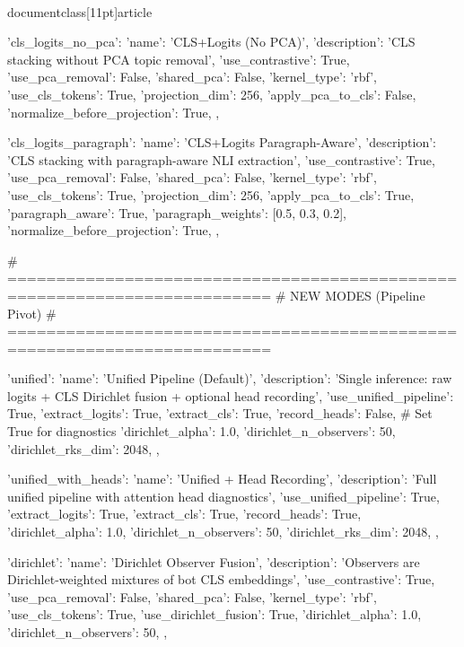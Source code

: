 \\documentclass[11pt]{article}
\begin{document}
\begin{CodeBlock}
{    'cls_logits_no_pca': {
        'name': 'CLS+Logits (No PCA)',
        'description': 'CLS stacking without PCA topic removal',
        'use_contrastive': True,
        'use_pca_removal': False,
        'shared_pca': False,
        'kernel_type': 'rbf',
        'use_cls_tokens': True,
        'projection_dim': 256,
        'apply_pca_to_cls': False,
        'normalize_before_projection': True,
    },
    
    'cls_logits_paragraph': {
        'name': 'CLS+Logits Paragraph-Aware',
        'description': 'CLS stacking with paragraph-aware NLI extraction',
        'use_contrastive': True,
        'use_pca_removal': False,
        'shared_pca': False,
        'kernel_type': 'rbf',
        'use_cls_tokens': True,
        'projection_dim': 256,
        'apply_pca_to_cls': True,
        'paragraph_aware': True,
        'paragraph_weights': [0.5, 0.3, 0.2],
        'normalize_before_projection': True,
    },
    
    # =========================================================================
    # NEW MODES (Pipeline Pivot)
    # =========================================================================
    
    'unified': {
        'name': 'Unified Pipeline (Default)',
        'description': 'Single inference: raw logits + CLS Dirichlet fusion + optional head recording',
        'use_unified_pipeline': True,
        'extract_logits': True,
        'extract_cls': True,
        'record_heads': False,  # Set True for diagnostics
        'dirichlet_alpha': 1.0,
        'dirichlet_n_observers': 50,
        'dirichlet_rks_dim': 2048,
    },
    
    'unified_with_heads': {
        'name': 'Unified + Head Recording',
        'description': 'Full unified pipeline with attention head diagnostics',
        'use_unified_pipeline': True,
        'extract_logits': True,
        'extract_cls': True,
        'record_heads': True,
        'dirichlet_alpha': 1.0,
        'dirichlet_n_observers': 50,
        'dirichlet_rks_dim': 2048,
    },
    
    'dirichlet': {
        'name': 'Dirichlet Observer Fusion',
        'description': 'Observers are Dirichlet-weighted mixtures of bot CLS embeddings',
        'use_contrastive': True,
        'use_pca_removal': False,
        'shared_pca': False,
        'kernel_type': 'rbf',
        'use_cls_tokens': True,
        'use_dirichlet_fusion': True,
        'dirichlet_alpha': 1.0,
        'dirichlet_n_observers': 50,
    },
    
}
\end{CodeBlock}
\end{document}
